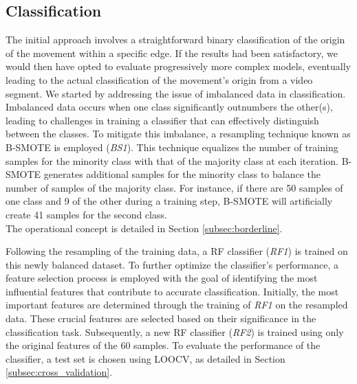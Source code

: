 \subsection{Classification}
The initial approach involves a straightforward binary classification of the origin of the movement within a specific edge.
If the results had been satisfactory, we would then have opted to evaluate progressively more complex models, eventually leading to the actual classification of the movement's origin from a video segment.
We started by addressing the issue of imbalanced data in classification. Imbalanced data occurs when one class significantly outnumbers the other(s), leading to challenges in training a classifier that can effectively distinguish between the classes.
To mitigate this imbalance, a resampling technique known as B-SMOTE is employed (\textit{BS1}). 
This technique equalizes the number of training samples for the minority class with that of the majority class at each iteration.
B-SMOTE generates additional samples for the minority class to balance the number of samples of the majority class.
For instance, if there are 50 samples of one class and 9 of the other during a training step, B-SMOTE will artificially create 41 samples for the second class. \\
The operational concept is detailed in Section \ref{subsec:borderline}.

Following the resampling of the training data, a RF classifier (\textit{RF1}) is trained on this newly balanced dataset.
To further optimize the classifier's performance, a feature selection process is employed with the goal of identifying the most influential features that contribute to accurate classification.
Initially, the most important features are determined through the training of \textit{RF1} on the resampled data. 
These crucial features are selected based on their significance in the classification task. 
Subsequently, a new RF classifier (\textit{RF2}) is trained using only the original features of the 60 samples. 
To evaluate the performance of the classifier, a test set is chosen using LOOCV, as detailed in Section \ref{subsec:cross_validation}. 

